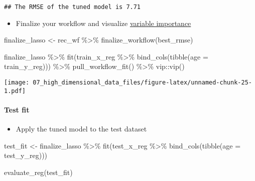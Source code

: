 \documentclass[
]{book}
\newenvironment{Shaded}{\begin{snugshade}}{\end{snugshade}}
\newcommand{\AttributeTok}[1]{\textcolor[rgb]{0.77,0.63,0.00}{#1}}
\newcommand{\FunctionTok}[1]{\textcolor[rgb]{0.00,0.00,0.00}{#1}}
\newcommand{\NormalTok}[1]{#1}
\newcommand{\OtherTok}[1]{\textcolor[rgb]{0.56,0.35,0.01}{#1}}
\newcommand{\SpecialCharTok}[1]{\textcolor[rgb]{0.00,0.00,0.00}{#1}}
\providecommand{\tightlist}{%
  \setlength{\itemsep}{0pt}\setlength{\parskip}{0pt}}
\begin{document}
\begin{verbatim}
## The RMSE of the tuned model is 7.71
\end{verbatim}

\begin{itemize}
\tightlist
\item
  Finalize your workflow and visualize \href{https://koalaverse.github.io/vip/articles/vip.html}{variable importance}
\end{itemize}

\begin{Shaded}
\begin{Highlighting}[]
\NormalTok{finalize\_lasso }\OtherTok{\textless{}{-}}\NormalTok{ rec\_wf }\SpecialCharTok{\%\textgreater{}\%}
  \FunctionTok{finalize\_workflow}\NormalTok{(best\_rmse)}

\NormalTok{finalize\_lasso }\SpecialCharTok{\%\textgreater{}\%}
  \FunctionTok{fit}\NormalTok{(train\_x\_reg }\SpecialCharTok{\%\textgreater{}\%} \FunctionTok{bind\_cols}\NormalTok{(}\FunctionTok{tibble}\NormalTok{(}\AttributeTok{age =}\NormalTok{ train\_y\_reg))) }\SpecialCharTok{\%\textgreater{}\%}
  \FunctionTok{pull\_workflow\_fit}\NormalTok{() }\SpecialCharTok{\%\textgreater{}\%}
\NormalTok{  vip}\SpecialCharTok{::}\FunctionTok{vip}\NormalTok{()}
\end{Highlighting}
\end{Shaded}

\texttt{[image: 07\_high\_dimensional\_data\_files/figure-latex/unnamed-chunk-25-1.pdf]}

\hypertarget{test-fit}{%
\paragraph{Test fit}\label{test-fit}}

\begin{itemize}
\tightlist
\item
  Apply the tuned model to the test dataset
\end{itemize}

\begin{Shaded}
\begin{Highlighting}[]
\NormalTok{test\_fit }\OtherTok{\textless{}{-}}\NormalTok{ finalize\_lasso }\SpecialCharTok{\%\textgreater{}\%} 
  \FunctionTok{fit}\NormalTok{(test\_x\_reg }\SpecialCharTok{\%\textgreater{}\%} \FunctionTok{bind\_cols}\NormalTok{(}\FunctionTok{tibble}\NormalTok{(}\AttributeTok{age =}\NormalTok{ test\_y\_reg)))}

\FunctionTok{evaluate\_reg}\NormalTok{(test\_fit)}
\end{Highlighting}
\end{Shaded}
\end{document}
